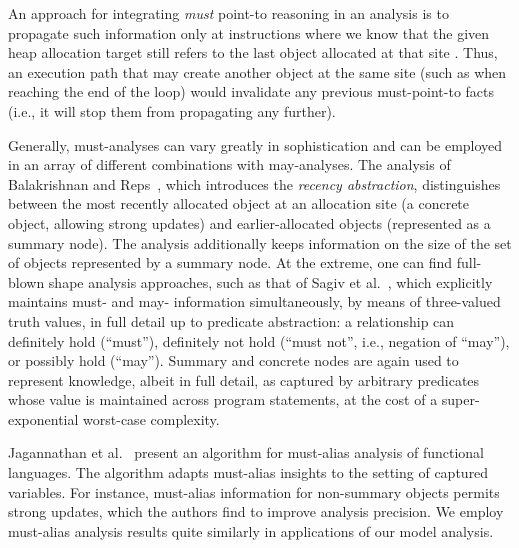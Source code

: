 An approach for integrating \emph{must} point-to reasoning in an
analysis is to propagate such
information only at instructions where we know that the given heap
allocation target still refers to the last object allocated at that
site \cite{popl:1995:Altucher}. Thus, an execution path
that may create another object at the same site (such as when reaching
the end of the loop) would invalidate any previous must-point-to facts
(i.e., it will stop them from propagating any further).

Generally, must-analyses can vary greatly in sophistication and can be
employed in an array of different combinations with may-analyses.  The
analysis of Balakrishnan and Reps~\cite{sas:2006:Balakrishnan}, which
introduces the \emph{recency abstraction}, distinguishes between the
most recently allocated object at an allocation site (a concrete
object, allowing strong updates) and earlier-allocated objects
(represented as a summary node). The analysis additionally keeps
information on the size of the set of objects represented by a summary
node. At the extreme, one can find full-blown shape analysis
approaches, such as that of Sagiv et
al.~\cite{article:2002:Sagiv}, which explicitly maintains must-
and may- information simultaneously, by means of three-valued truth
values, in full detail up to predicate abstraction: a
relationship can definitely hold (``must''), definitely not hold
(``must not'', i.e., negation of ``may''), or possibly hold
(``may''). Summary and concrete nodes are again used to represent
knowledge, albeit in full detail, as captured by arbitrary predicates
whose value is maintained across program statements, at the cost of a
super-exponential worst-case complexity.

Jagannathan et al.~\cite{popl:1998:Jagannathan} present
an algorithm for must-alias analysis of functional languages. The
algorithm adapts must-alias insights to the setting of captured
variables.
For instance, must-alias information for
non-summary objects permits strong updates, which the authors find to
improve analysis precision. We employ must-alias analysis results
quite similarly in applications of our model analysis.




